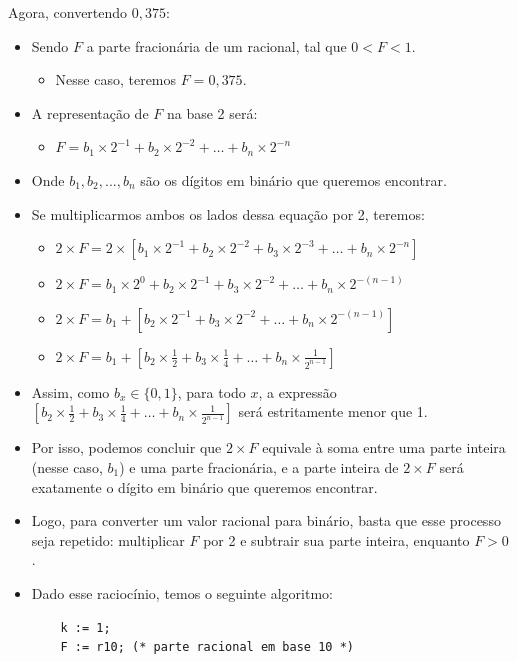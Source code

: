 \documentclass[12pt]{article}
\begin{document}
\newpage
\noindent
Agora, convertendo $0,375$:
\begin{itemize}
    \item Sendo $F$ a parte fracionária de um racional, tal que $0 < F < 1$.
    \begin{itemize}
        \item [""] Nesse caso, teremos $F = 0,375$.
    \end{itemize}
    \item A representação de $F$ na base 2 será:
    \begin{itemize}
        \item [""] $F = b_{1} \times 2^{-1} + b_{2} \times 2^{-2} + \dots + b_{n} \times 2^{-n}$
    \end{itemize}
    \item [""] Onde $b_{1}, b_{2}, ..., b_{n}$ são os dígitos em binário que queremos encontrar.
    \item Se multiplicarmos ambos os lados dessa equação por 2, teremos:
    \begin{itemize}
        \item [""] $2 \times F = 2 \times [b_{1} \times 2^{-1} + b_{2} \times 2^{-2} + b_{3} \times 2^{-3} + \dots + b_{n} \times 2^{-n}]$
        \item [""] $2 \times F = b_{1} \times 2^{0} + b_{2} \times 2^{-1} + b_{3} \times 2^{-2} + \dots + b_{n} \times 2^{-(n-1)}$
        \item [""] $2 \times F = b_{1} + [b_{2} \times 2^{-1} + b_{3} \times 2^{-2} + \dots + b_{n} \times 2^{-(n-1)}]$
        \item [""] $2 \times F = b_{1} + [b_{2} \times \frac{1}{2} + b_{3} \times \frac{1}{4} + \dots + b_{n} \times \frac{1}{2^{n-1}}]$
    \end{itemize}
    \item [""] Assim, como $b_{x} \in \{0, 1\}$, para todo $x$, a expressão $[b_{2} \times \frac{1}{2} + b_{3} \times \frac{1}{4} + \dots + b_{n} \times \frac{1}{2^{n-1}}]$ será estritamente menor que 1.
    \item Por isso, podemos concluir que $2 \times F$ equivale à soma entre uma parte inteira (nesse caso, $b_{1}$) e uma parte fracionária, e a parte inteira de $2 \times F$ será exatamente o dígito em binário que queremos encontrar.
    \item Logo, para converter um valor racional para binário, basta que esse processo seja repetido: multiplicar $F$ por 2 e subtrair sua parte inteira, enquanto $F > 0$.
    \item Dado esse raciocínio, temos o seguinte algoritmo:
    \begin{verbatim}
    k := 1;
    F := r10; (* parte racional em base 10 *)


\end{verbatim}
\end{itemize}
\end{document}
